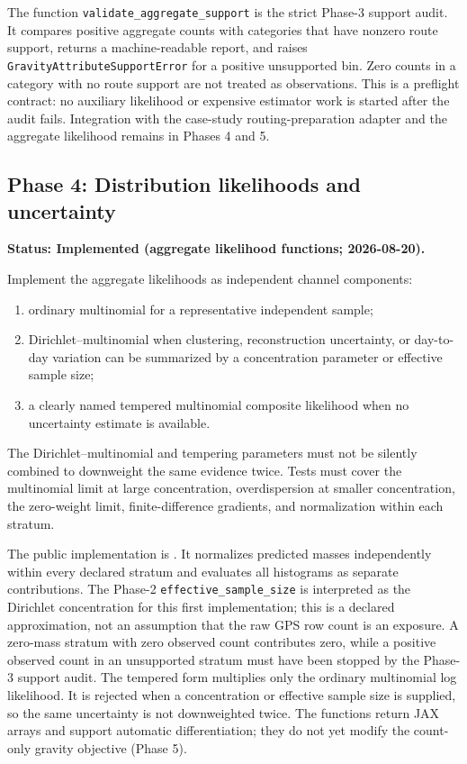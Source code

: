 The function \texttt{validate\_aggregate\_support} is the strict Phase-3
support audit.  It compares positive aggregate counts with categories that
have nonzero route support, returns a machine-readable report, and raises
\texttt{GravityAttributeSupportError} for a positive unsupported bin.  Zero
counts in a category with no route support are not treated as observations.
This is a preflight contract: no auxiliary likelihood or expensive estimator
work is started after the audit fails.  Integration with the case-study
routing-preparation adapter and the aggregate likelihood remains in Phases 4
and 5.

\subsection{Phase 4: Distribution likelihoods and uncertainty}
\label{sec:gps-implementation-phase-4}
\textbf{Status: Implemented (aggregate likelihood functions; 2026-08-20).}

Implement the aggregate likelihoods as independent channel components:

\begin{enumerate}
  \item ordinary multinomial for a representative independent sample;
  \item Dirichlet--multinomial when clustering, reconstruction uncertainty, or
    day-to-day variation can be summarized by a concentration parameter or
    effective sample size;
  \item a clearly named tempered multinomial composite likelihood when no
    uncertainty estimate is available.
\end{enumerate}

The Dirichlet--multinomial and tempering parameters must not be silently
combined to downweight the same evidence twice.  Tests must cover the
multinomial limit at large concentration, overdispersion at smaller
concentration, the zero-weight limit, finite-difference gradients, and
normalization within each stratum.

The public implementation is
.  It normalizes
predicted masses independently within every declared stratum and evaluates
all histograms as separate contributions.  The Phase-2
\texttt{effective\_sample\_size} is interpreted as the Dirichlet concentration
for this first implementation; this is a declared approximation, not an
assumption that the raw GPS row count is an exposure.  A zero-mass stratum
with zero observed count contributes zero, while a positive observed count in
an unsupported stratum must have been stopped by the Phase-3 support audit.
The tempered form multiplies only the ordinary multinomial log likelihood.
It is rejected when a concentration or effective sample size is supplied, so
the same uncertainty is not downweighted twice.  The functions return JAX
arrays and support automatic differentiation; they do not yet modify the
count-only gravity objective (Phase 5).

